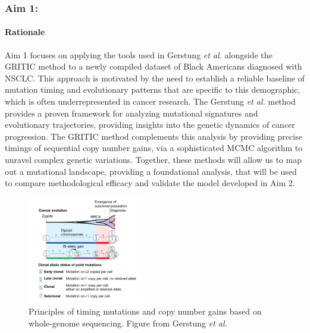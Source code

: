 

\subsubsection{Aim 1: \SpecificAimOne}

\paragraph{Rationale}

Aim 1 focuses on applying the tools used in Gerstung \textit{et al.} alongside the 
GRITIC method to a newly compiled dataset of Black Americans diagnosed with NSCLC. 
This approach is motivated by the need to establish a reliable baseline of 
mutation timing and evolutionary patterns that are specific to this demographic, 
which is often underrepresented in cancer research. 
The Gerstung \textit{et al.} method provides a proven framework 
for analyzing mutational signatures and evolutionary trajectories, 
providing insights into the genetic dynamics of cancer progression. 
The GRITIC method complements this analysis by providing precise timings of sequential copy number gains, 
via a sophisticated MCMC algorithm to unravel complex genetic variations. 
Together, these methods will allow us to map out a mutational landscape, 
providing a foundational analysis, that will be used to compare methodological efficacy 
and validate the model developed in Aim 2. 

\begin{figure}
  \begin{mdframed}
  \includegraphics[width=2.0in]{./Figures/definitions.png}
  \caption{Principles of timing mutations and copy number gains based on whole-genome sequencing. 
  Figure from Gerstung \textit{et al.}
  }
  \label{definitions}
  \end{mdframed}
\end{figure}



